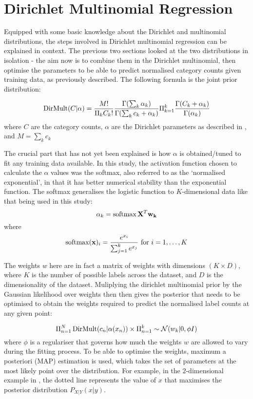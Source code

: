 \section{Dirichlet Multinomial Regression}
Equipped with some basic knowledge about the Dirichlet and multinomial distributions, the steps involved in Dirichlet multinomial regression can be explained in context. The previous two sections looked at the two distributions in isolation - the aim now is to combine them in the Dirichlet multinomial, then optimise the parameters to be able to predict normalised category counts given training data, as previously described. The following formula is the joint prior distribution:

\begin{equation}
    \operatorname{DirMult}(C|\alpha) = \frac{M!}{\Pi_k C_k!} \frac{\Gamma(\sum_k \alpha_k)}{\Gamma(\sum_k c_k + \alpha_k)} \Pi_{k=1}^k \frac{\Gamma(C_k + \alpha_k)}{\Gamma(\alpha_k)}
\end{equation}
where $C$ are the category counts, $\alpha$ are the Dirichlet parameters as described in , and $M = \sum_k c_k$

The crucial part that has not yet been explained is how $\alpha$ is obtained/tuned to fit any training data available. In this study, the activation function chosen to calculate the $\alpha$ values was the softmax, also referred to as the `normalised exponential', in that it has better numerical stability than the exponential function. The softmax generalises the logistic function to $K$-dimensional data like that being used in this study:
\begin{equation}
    \alpha_k = \operatorname{softmax}{\mathbf{X}^T \mathbf{w_k}}
\end{equation}
where \begin{equation}\label{eq:softmax}
    \operatorname{softmax}(\mathbf{x})_i = \frac{e^{x_i}}{\sum_{j=1}^k e^{x_j}} \text{ for } i = 1, \ldots, K
\end{equation}

The weights $w$ here are in fact a matrix of weights with dimensions $(K \times D)$, where $K$ is the number of possible labels across the dataset, and $D$ is the dimensionality of the dataset. Muliplying the dirichlet multinomial prior by the Gaussian likelihood over weights then then gives the posterior that needs to be optimised to obtain the weights required to predict the normalised label counts at any given point:

\begin{equation}
    \Pi_{n=1}^N \operatorname{DirMult} (c_n | \alpha(x_n)) \times \Pi_{n=1}^k \sim \mathcal{N}(w_k | 0, \phi I)
\end{equation}
where $\phi$ is a regulariser that governs how much the weights $w$ are allowed to vary during the fitting process. To be able to optimise the weights, maximum a posteriori (MAP) estimation is used, which takes the set of parameters at the most likely point over the distribution. For example, in the $2$-dimensional example in , the dotted line represents the value of $x$ that maximises the posterior distribution $P_{X|Y}(x|y)$.

